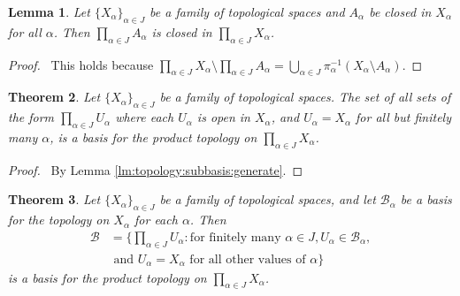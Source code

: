 \documentclass{report}
\let\qed\relax
\newtheorem{lm}{Lemma}[section]
\newtheorem{thm}[lm]{Theorem}
\theoremstyle{definition}
\begin{document}
  \begin{lm}
    Let $\{ X_\alpha \}_{\alpha \in J}$ be a family of topological spaces and
    $A_\alpha$ be closed in $X_\alpha$ for all $\alpha$. Then $\prod_{\alpha
      \in J} A_\alpha$ is closed in $\prod_{\alpha \in J} X_\alpha$.
  \end{lm}

  \begin{proof}
    \pf\ This holds because $\prod_{\alpha \in J} X_\alpha \setminus
    \prod_{\alpha \in J} A_\alpha = \bigcup_{\alpha \in J}
    \pi_\alpha^{-1}(X_\alpha \setminus A_\alpha)$. \qed
  \end{proof}

  \begin{thm}
    \label{thm:topology:product:basis}
    Let $\{ X_\alpha \}_{\alpha \in J}$ be a family of topological spaces.
    The set of all sets of the form $\prod_{\alpha \in J} U_\alpha$ where each
    $U_\alpha$ is open in $X_\alpha$, and $U_\alpha = X_\alpha$ for all but
    finitely many $\alpha$, is a basis for the product topology on
    $\prod_{\alpha
      \in J} X_\alpha$.
  \end{thm}

  \begin{proof}
    \pf\ By Lemma \ref{lm:topology:subbasis:generate}. \qed
  \end{proof}

  \begin{thm}
    Let $\{X_\alpha\}_{\alpha \in J}$ be a family of topological spaces, and
    let $\mathcal{B}_\alpha$ be a basis for the topology on $X_\alpha$ for each
    $\alpha$. Then
    \begin{align*}
      \mathcal{B} & = \{ \prod_{\alpha \in J} U_\alpha : \text{for finitely
        many
      } \alpha \in J, U_\alpha \in \mathcal{B}_\alpha,  \\
      &  \text{ and } U_\alpha =
      X_\alpha \text{ for all other values of } \alpha \}
    \end{align*}
    is a basis for the product topology on $\prod_{\alpha \in J} X_\alpha$.
  \end{thm}
\end{document}

